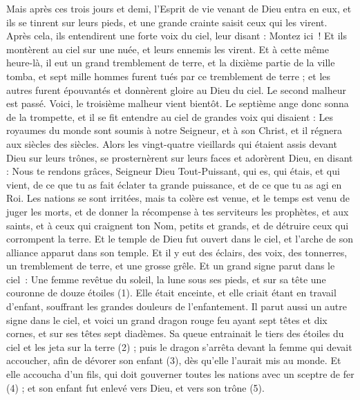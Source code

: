 \begin{multicols}{2}
Mais après ces trois jours et demi, l'Esprit de vie venant de Dieu entra en eux, et ils se tinrent sur leurs pieds, et une grande crainte saisit ceux qui les virent.
Après cela, ils entendirent une forte voix du ciel, leur disant : Montez ici ! Et ils montèrent au ciel sur une nuée, et leurs ennemis les virent.
Et à cette même heure-là, il eut un grand tremblement de terre, et la dixième partie de la ville tomba, et sept mille hommes furent tués par ce tremblement de terre ; et les autres furent épouvantés et donnèrent gloire au Dieu du ciel.
Le second malheur est passé. Voici, le troisième malheur vient bientôt.
Le septième ange donc sonna de la trompette, et il se fit entendre au ciel de grandes voix qui disaient : Les royaumes du monde sont soumis à notre Seigneur, et à son Christ, et il régnera aux siècles des siècles.
Alors les vingt-quatre vieillards qui étaient assis devant Dieu sur leurs trônes, se prosternèrent sur leurs faces et adorèrent Dieu,
en disant : Nous te rendons grâces, Seigneur Dieu Tout-Puissant, qui es, qui étais, et qui vient, de ce que tu as fait éclater ta grande puissance, et de ce que tu as agi en Roi.
Les nations se sont irritées, mais ta colère est venue, et le temps est venu de juger les morts, et de donner la récompense à tes serviteurs les prophètes, et aux saints, et à ceux qui craignent ton Nom, petits et grands, et de détruire ceux qui corrompent la terre.
Et le temple de Dieu fut ouvert dans le ciel, et l'arche de son alliance apparut dans son temple. Et il y eut des éclairs, des voix, des tonnerres, un tremblement de terre, et une grosse grêle.
\VerseOne{}Et un grand signe parut dans le ciel : Une femme revêtue du soleil, la lune sous ses pieds, et sur sa tête une couronne de douze étoiles (1).
Elle était enceinte, et elle criait étant en travail d’enfant, souffrant les grandes douleurs de l'enfantement.
Il parut aussi un autre signe dans le ciel, et voici un grand dragon rouge feu ayant sept têtes et dix cornes, et sur ses têtes sept diadèmes.
Sa queue entrainait le tiers des étoiles du ciel et les jeta sur la terre (2) ; puis le dragon s'arrêta devant la femme qui devait accoucher, afin de dévorer son enfant (3), dès qu'elle l'aurait mis au monde.
Et elle accoucha d'un fils, qui doit gouverner toutes les nations avec un sceptre de fer (4) ; et son enfant fut enlevé vers Dieu, et vers son trône (5).

\end{multicols}
